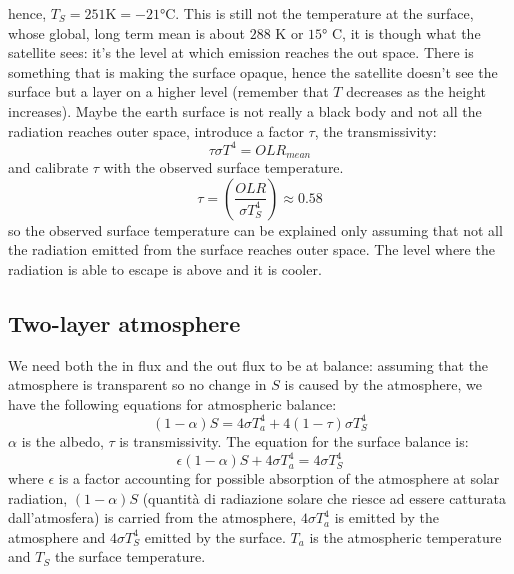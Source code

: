 hence, $T_S=251 \text{K}=-21°\text{C}$. This is still not the temperature at the surface, whose global, long term
mean is about $288$ K or $15°$ C, it is though what the satellite sees: it's the level at which emission reaches the out space. There is something that is making the surface opaque, hence the satellite doesn't see the surface but a layer on a higher level (remember that $T$ decreases as the height increases).
Maybe the earth surface is not really a black body and not all the
radiation reaches outer space, introduce a factor $\tau$, the transmissivity:
$$\tau\sigma T^4=OLR_{mean}$$
and calibrate $\tau$ with the observed surface temperature.
\begin{equation}\label{eq.tau}
	\tau=\left(\frac{OLR}{\sigma T_S^4}\right)\approx 0.58
\end{equation}
so the observed surface temperature can be explained only assuming that not all the radiation emitted from the surface reaches outer space. The level where the radiation is able to escape is above and it is cooler.
\subsection{Two-layer atmosphere}
We need both the in flux and the out flux to be at balance: assuming that the atmosphere is transparent so no change in $S$ is caused by the atmosphere, we have the following equations for atmospheric balance:
\begin{equation}\label{eq.two layer}
	(1-\alpha)S=4\sigma T^4_{a}+4(1-\tau)\sigma T_S^4
\end{equation}
$\alpha$ is the albedo, $\tau$ is transmissivity. The equation for the surface balance is:
\begin{equation}\label{eq.surface balance}
	\epsilon (1-\alpha)S+4\sigma T_a^4=4\sigma T_S^4
\end{equation}
where $\epsilon$ is a factor accounting for possible absorption of the atmosphere at solar radiation, $(1-\alpha)S$ (quantità di radiazione solare che riesce ad essere catturata dall'atmosfera) is carried from the atmosphere, $4\sigma T_a^4$ is emitted by the atmosphere and $4\sigma T_S^4$ emitted by the surface.
$T_a$ is the atmospheric temperature and $T_S$ the surface temperature.


